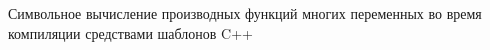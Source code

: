 \documentclass[11pt,a4paper]{article}
\begin{document}
\begin{center}
  Символьное вычисление производных функций многих переменных во время компиляции средствами шаблонов C++
\end{center}

\begin{Введение}

\begin{comment}
Тут на днях писали про аналитическое нахождение производных, что напомнило мне об одной моей маленькой библиотечке на C++, которая делает почти то же, но во время компиляции.



В чём профит? Ответ прост: мне нужно было запрогать нахождение минимума достаточно сложной функции, считать производные этой функции по её параметрам ручкой на бумажке было лень, проверять потом, что я не опечатался при написании кода, и поддерживать этот самый код — лень вдвойне, поэтому было решено написать штуковину, которая это сделает за меня. Ну, чтобы в коде можно было написать что-то такое:

using Formula_t = decltype (k * (_1 - r0) / (_1 + r0) * (g0 / (alpha0 - logr0 / Num<300>) - _1));    // сама формула
const auto residual = Formula_t::Eval (datapoint) - knownValue;    // регрессионный остаток

// производные по параметрам:
const auto dg0 = VarDerivative_t<Formula_t, decltype (g0)>::Eval (datapoint);
const auto dalpha0 = VarDerivative_t<Formula_t, decltype (alpha0)>::Eval (datapoint);
const auto dk = VarDerivative_t<Formula_t, decltype (k)>::Eval (datapoint);

Вместо крокодилов, которые получатся, если брать частные производные функции на картинке вначале (вернее, некоторого её упрощённого варианта, но он выглядит не так страшно).

Ещё неплохо быть достаточно уверенным, что компилятор это соптимизирует так, как если бы соответствующие производные и функции были написаны руками. А уверенным быть бы хотелось — находить минимум нужно было очень много раз (действительно много, где-то от сотни миллионов до миллиарда, в этом была суть некоего вычислительного эксперимента), поэтому вычисление производных было бы бутылочным горлышком, происходи оно во время выполнения через какую-нибудь рекурсию по древообразной структуре. Если же заставить компилятор вычислять производную, собственно, во время компиляции, то есть шанс, что он по получившемуся коду ещё пройдётся оптимизатором, и мы не потеряем по сравнению с ручным выписыванием всех производных. Шанс реализовался, кстати.


\end{comment}
\end{Введение}
\end{document}
